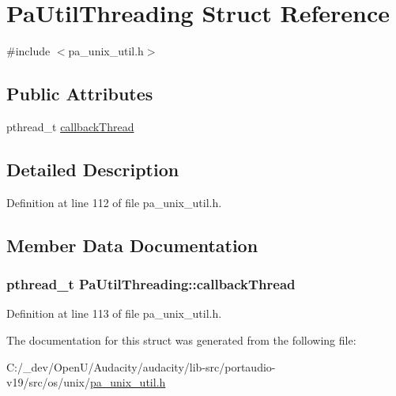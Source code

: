 \hypertarget{struct_pa_util_threading}{}\section{Pa\+Util\+Threading Struct Reference}
\label{struct_pa_util_threading}


{\ttfamily \#include $<$pa\+\_\+unix\+\_\+util.\+h$>$}

\subsection*{Public Attributes}
\begin{DoxyCompactItemize}
\item 
pthread\+\_\+t \hyperlink{struct_pa_util_threading_a9553eb5e28d393f7fd8a2e8517aa5e50}{callback\+Thread}
\end{DoxyCompactItemize}


\subsection{Detailed Description}


Definition at line 112 of file pa\+\_\+unix\+\_\+util.\+h.



\subsection{Member Data Documentation}
\subsubsection[{\texorpdfstring{callback\+Thread}{callbackThread}}]{\setlength{\rightskip}{0pt plus 5cm}pthread\+\_\+t Pa\+Util\+Threading\+::callback\+Thread}\hypertarget{struct_pa_util_threading_a9553eb5e28d393f7fd8a2e8517aa5e50}{}\label{struct_pa_util_threading_a9553eb5e28d393f7fd8a2e8517aa5e50}


Definition at line 113 of file pa\+\_\+unix\+\_\+util.\+h.



The documentation for this struct was generated from the following file\+:\begin{DoxyCompactItemize}
\item 
C\+:/\+\_\+dev/\+Open\+U/\+Audacity/audacity/lib-\/src/portaudio-\/v19/src/os/unix/\hyperlink{pa__unix__util_8h}{pa\+\_\+unix\+\_\+util.\+h}\end{DoxyCompactItemize}
